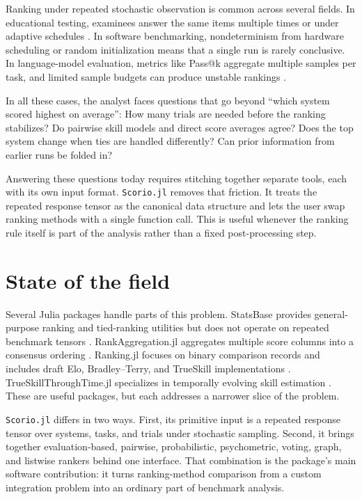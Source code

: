 \documentclass{juliacon}
\newcommand{\scorio}{\texttt{Scorio.jl}}
\begin{document}
Ranking under repeated stochastic observation is common across several fields. In educational testing, examinees answer the same items multiple times or under adaptive schedules \cite{BockAitkin1981,LairdWare1982}. In software benchmarking, nondeterminism from hardware scheduling or random initialization means that a single run is rarely conclusive. In language-model evaluation, metrics like Pass@k aggregate multiple samples per task, and limited sample budgets can produce unstable rankings \cite{chen2021evaluating,hariri2025dontpassk}.

In all these cases, the analyst faces questions that go beyond ``which system scored highest on average'': How many trials are needed before the ranking stabilizes? Do pairwise skill models and direct score averages agree? Does the top system change when ties are handled differently? Can prior information from earlier runs be folded in?

Answering these questions today requires stitching together separate tools, each with its own input format. \scorio{} removes that friction. It treats the repeated response tensor as the canonical data structure and lets the user swap ranking methods with a single function call. This is useful whenever the ranking rule itself is part of the analysis rather than a fixed post-processing step.

\section{State of the field}

Several Julia packages handle parts of this problem. StatsBase provides general-purpose ranking and tied-ranking utilities but does not operate on repeated benchmark tensors \cite{statsbasejl}. RankAggregation.jl aggregates multiple score columns into a consensus ordering \cite{rankaggregationjl}. Ranking.jl focuses on binary comparison records and includes draft Elo, Bradley--Terry, and TrueSkill implementations \cite{rankingjl}. TrueSkillThroughTime.jl specializes in temporally evolving skill estimation \cite{trueskillthroughtimejl}. These are useful packages, but each addresses a narrower slice of the problem.

\scorio{} differs in two ways. First, its primitive input is a repeated response tensor over systems, tasks, and trials under stochastic sampling. Second, it brings together evaluation-based, pairwise, probabilistic, psychometric, voting, graph, and listwise rankers behind one interface. That combination is the package's main software contribution: it turns ranking-method comparison from a custom integration problem into an ordinary part of benchmark analysis.
\end{document}
